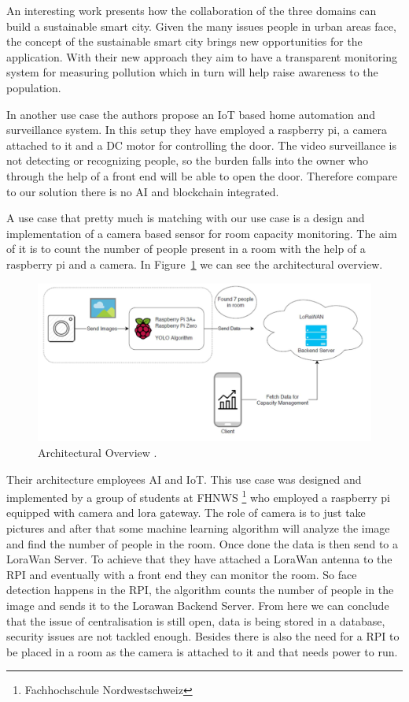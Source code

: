 An interesting work \cite{smartcity}  presents how the collaboration of the three domains can build a sustainable smart city. Given the many issues people in urban areas face, the concept of the sustainable smart city brings new opportunities for the application. With their new approach they aim to have a transparent monitoring system for measuring pollution which in turn will help raise awareness to the population. 

In another use case \cite{refhomeauto} the authors propose an IoT based home automation and surveillance system. In this setup they have employed a raspberry pi, a camera attached to it and a DC motor for controlling the door. The video surveillance is not detecting or recognizing people, so the burden falls into the owner who through the help of a front end will be able to open the door. Therefore compare to our solution there is no AI and blockchain integrated. 


A use case that pretty much is matching with our use case is a design and implementation of a camera based sensor for room capacity monitoring. The aim of it is to count the number of people present in a room with the help of a raspberry pi and a camera. In Figure~\ref{fig:raum} we can see the architectural overview. 

\begin{figure}[!htb]
    \centering
    \includegraphics[width=1\textwidth]{figures/raumbelegung.png}
    \caption{Architectural Overview \cite{raumbelegung}.}
    \label{fig:raum}
\end{figure}

Their architecture employees AI and IoT. This use case was designed and implemented by a group of students at FHNWS \footnote[1]{Fachhochschule Nordwestschweiz} who employed a raspberry pi equipped with camera and lora gateway. The role of camera is to just take pictures and after that some machine learning algorithm will analyze the image and find the number of people in the room. Once done the data is then send to a LoraWan Server. To achieve that they have attached a LoraWan antenna to the RPI and eventually with a front end they can monitor the room. So face detection happens in the RPI, the algorithm counts the number of people in the image and sends it to the Lorawan Backend Server. From here we can conclude that the issue of centralisation is still open, data is being stored in a database, security issues are not tackled enough. Besides there is also the need for a RPI to be placed in a room as the camera is attached to it and that needs power to run. 

